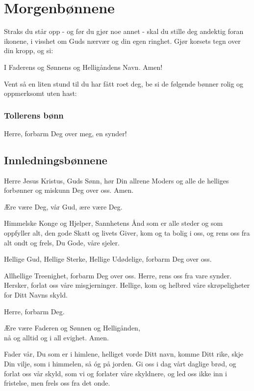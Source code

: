 \section{Morgenbønnene}

\begin{forklaring}
Straks du står opp - og før du gjør noe annet - skal du stille deg andektig foran ikonene, i visshet om Guds nærvær og din egen ringhet. Gjør korsets tegn over din kropp, og si:
\end{forklaring}

I Faderens og Sønnens og Helligåndens Navn. Amen!

\begin{forklaring}
Vent så en liten stund til du har fått roet deg, be si de følgende bønner rolig og oppmerksomt uten hast:
\end{forklaring}

\subsubsection{Tollerens bønn}

Herre, forbarm Deg over meg, en synder!

\subsection{Innledningsbønnene}

Herre Jesus Kristus, Guds Sønn, hør Din allrene Moders og alle de helliges forbønner og miskunn Deg over oss. Amen.

Ære være Deg, vår Gud, ære være Deg.

Himmelske Konge og Hjelper, Sannhetens Ånd som er alle steder og som oppfyller alt, den gode Skatt og livets Giver, kom og ta bolig i oss, og rens oss fra alt ondt og frels, Du Gode, våre sjeler.

Hellige Gud, Hellige Sterke, Hellige Udødelige, forbarm Deg over oss. 

Allhellige Treenighet, forbarm Deg over oss. Herre, rens oss fra vare synder. Hersker, forlat oss våre misgjerninger. Hellige, kom og helbred våre skrøpeligheter for Ditt Navns skyld.

Herre, forbarm Deg. 

Ære være Faderen og Sønnen og Helligånden,\\
nå og alltid og i all evighet. Amen.

Fader vår, Du som er i himlene, helliget vorde Ditt navn, komme Ditt rike, skje Din vilje, som i himmelen, så óg på jorden. Gi oss i dag vårt daglige brød, og forlat oss vår skyld, som vi og forlater våre skyldnere, og led oss ikke inn i fristelse, men frels oss fra det onde.

